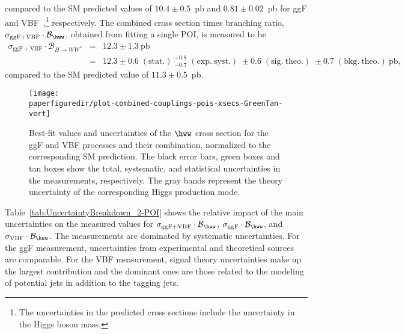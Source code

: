 compared to the SM predicted values of $10.4\pm 0.5$~pb and $0.81\pm 0.02$~pb for ggF and VBF~\cite{deFlorian:2016spz},\footnote{The uncertainties in the predicted cross sections include the uncertainty in the Higgs boson mass.} respectively.
The combined cross section times branching ratio, $\sigma_{\mathrm{ggF+VBF}} \cdot \mathcal{B}_{\hww}$, obtained from fitting a single POI, is measured to be
\begin{eqnarray*}
\sigma_{\mathrm{ggF+VBF}} \cdot \mathcal{B}_{H \to WW^{\ast}} &=& 12.3 \pm 1.3~\mathrm{pb} \\
&=& 12.3 \pm 0.6\;(\mathrm{stat.})\;^{+0.8}_{-0.7}\;(\mathrm{exp.\ syst.})\;\pm 0.6\;(\mathrm{sig.\ theo.})\;\pm 0.7\;(\mathrm{bkg.\ theo.})~\mathrm{pb},
\end{eqnarray*}
compared to the SM predicted value of $11.3\pm 0.5$~pb.

\begin{figure}[htb]
\centering
  \texttt{[image: \\paperfiguredir/plot-combined-couplings-pois-xsecs-GreenTan-vert]}
  \caption{
    Best-fit values and uncertainties of the $\hww$ cross section for the ggF and VBF processes and their combination, normalized to the corresponding SM prediction.
    The black error bars, green boxes and tan boxes show the total, systematic, and statistical uncertainties in the measurements, respectively.
    The gray bands represent the theory uncertainty of the corresponding Higgs production mode.
    \label{fig:couplings-POIs}
  }
\end{figure}


Table~\ref{tab:UncertaintyBreakdown_2-POI} shows the relative impact of the main uncertainties on the measured values for $\sigma_{\mathrm{ggF+VBF}} \cdot \mathcal{B}_{\hww}$, $\sigma_{\mathrm{ggF}} \cdot \mathcal{B}_{\hww}$, and $\sigma_{\mathrm{VBF}}  \cdot \mathcal{B}_{\hww}$.
The measurements are dominated by systematic uncertainties.
For the ggF measurement, uncertainties from experimental and theoretical sources are comparable.
For the VBF measurement, signal theory uncertainties make up the largest contribution and the dominant ones are those related to the modeling of potential jets in addition to the tagging jets.

